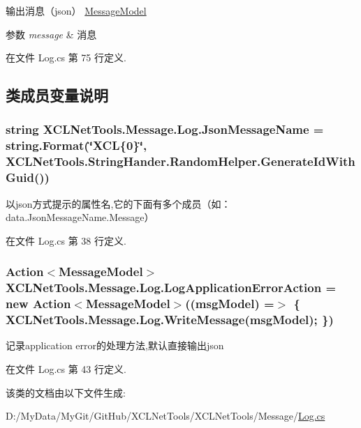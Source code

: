 输出消息（json） \hyperlink{class_x_c_l_net_tools_1_1_message_1_1_message_model}{Message\-Model} 


\begin{DoxyParams}{参数}
{\em message} & 消息\\
\hline
\end{DoxyParams}


在文件 Log.\-cs 第 75 行定义.



\subsection{类成员变量说明}
\hypertarget{class_x_c_l_net_tools_1_1_message_1_1_log_ac9218999b3da2b5fbd7476e1ae47ca71}{
\subsubsection[{Json\-Message\-Name}]{\setlength{\rightskip}{0pt plus 5cm}string X\-C\-L\-Net\-Tools.\-Message.\-Log.\-Json\-Message\-Name = string.\-Format(\char`\"{}X\-C\-L\{0\}\char`\"{}, X\-C\-L\-Net\-Tools.\-String\-Hander.\-Random\-Helper.\-Generate\-Id\-With\-Guid())\hspace{0.3cm}{\ttfamily [static]}}}\label{class_x_c_l_net_tools_1_1_message_1_1_log_ac9218999b3da2b5fbd7476e1ae47ca71}


以json方式提示的属性名,它的下面有多个成员（如：data.\-Json\-Message\-Name.\-Message） 



在文件 Log.\-cs 第 38 行定义.

\hypertarget{class_x_c_l_net_tools_1_1_message_1_1_log_aeb571cf7294cbdc7776e44c5654b28d4}{
\subsubsection[{Log\-Application\-Error\-Action}]{\setlength{\rightskip}{0pt plus 5cm}Action$<${\bf Message\-Model}$>$ X\-C\-L\-Net\-Tools.\-Message.\-Log.\-Log\-Application\-Error\-Action = new Action$<${\bf Message\-Model}$>$((msg\-Model) =$>$ \{ {\bf X\-C\-L\-Net\-Tools.\-Message.\-Log.\-Write\-Message}(msg\-Model); \})\hspace{0.3cm}{\ttfamily [static]}}}\label{class_x_c_l_net_tools_1_1_message_1_1_log_aeb571cf7294cbdc7776e44c5654b28d4}


记录application error的处理方法,默认直接输出json 



在文件 Log.\-cs 第 43 行定义.



该类的文档由以下文件生成\-:\begin{DoxyCompactItemize}
\item 
D\-:/\-My\-Data/\-My\-Git/\-Git\-Hub/\-X\-C\-L\-Net\-Tools/\-X\-C\-L\-Net\-Tools/\-Message/\hyperlink{_log_8cs}{Log.\-cs}\end{DoxyCompactItemize}
